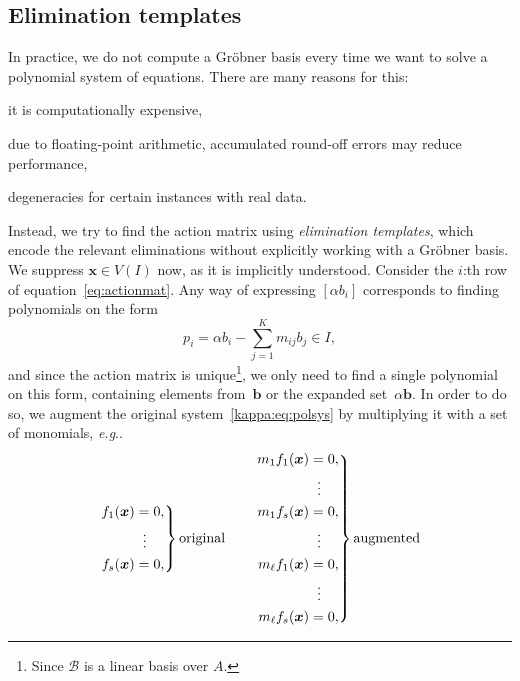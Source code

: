 \documentclass[11pt,a4paper]{article}
\makeatletter
\theoremstyle{definition}
\newcommand{\mat}[1]{\bm{#1}}
\DeclareRobustCommand\eg{\emph{e.g}\@ifnextchar.{}{.\@}}
\makeatother
\begin{document}
\subsection{Elimination templates}
In practice, we do not compute a Gröbner basis every time we want to solve a polynomial system
of equations. There are many reasons for this:
\begin{enumerate*}[label={(\roman*)}]
\item it is computationally expensive,
\item due to floating-point arithmetic, accumulated round-off errors may reduce performance,
\item degeneracies for certain instances with real data.
\end{enumerate*}
Instead, we try to find the action matrix using \emph{elimination templates}, which encode the
relevant eliminations without explicitly working with a Gröbner basis.
We suppress $\mat{x}\in V(I)$ now, as it is implicitly understood.
Consider the $i$:th row of equation~\eqref{eq:actionmat}. Any way of expressing $[\alpha b_i]$
corresponds to finding polynomials on the form
\begin{equation}\label{eq:polys}
    p_i = \alpha b_i -\sum_{j=1}^Km_{ij}b_{j}\in I,
\end{equation}
and since the action matrix is unique\footnote{Since $\mathcal{B}$ is a linear basis over $A$.},
we only need to find a single polynomial on this form, containing elements from~$\mat{b}$ or the
expanded set~$\alpha\mat{b}$.
In order to do so, we augment the original system~\eqref{kappa:eq:polsys} by multiplying it
with a set of monomials, \eg{}
\begin{equation}\label{kappa:eq:polsys-aug}
    \begin{aligned}
    \left.
    \begin{aligned}
    f_1(\mat{x}) & = 0, \\
                 & \hspace{0.575em} \vdots \\
    f_s(\mat{x}) & = 0, \\
    \end{aligned}
    \right\}\text{original}
    \qquad
    \left.
    \begin{aligned}
    m_1f_1(\mat{x}) & = 0, \\
                 & \hspace{0.575em} \vdots \\
    m_1f_s(\mat{x}) & = 0, \\
                 & \hspace{0.575em} \vdots \\
    m_\ell f_1(\mat{x}) & = 0, \\
                 & \hspace{0.575em} \vdots \\
    m_\ell f_s(\mat{x}) & = 0,
    \end{aligned}
    \right\}\text{augmented}
    \end{aligned}
\end{equation}
\end{document}
